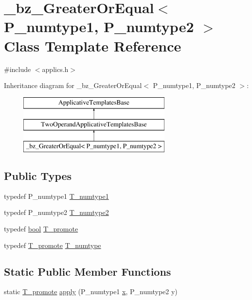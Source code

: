 \hypertarget{class__bz__GreaterOrEqual}{}\section{\+\_\+bz\+\_\+\+Greater\+Or\+Equal$<$ P\+\_\+numtype1, P\+\_\+numtype2 $>$ Class Template Reference}
\label{class__bz__GreaterOrEqual}


{\ttfamily \#include $<$applics.\+h$>$}

Inheritance diagram for \+\_\+bz\+\_\+\+Greater\+Or\+Equal$<$ P\+\_\+numtype1, P\+\_\+numtype2 $>$\+:\begin{figure}[H]
\begin{center}
\leavevmode
\includegraphics[height=3.000000cm]{class__bz__GreaterOrEqual}
\end{center}
\end{figure}
\subsection*{Public Types}
\begin{DoxyCompactItemize}
\item 
typedef P\+\_\+numtype1 \hyperlink{class__bz__GreaterOrEqual_a427aca022106d9b3990725620e1be311}{T\+\_\+numtype1}
\item 
typedef P\+\_\+numtype2 \hyperlink{class__bz__GreaterOrEqual_a1fbd58ed0a844c86926aff76b978a569}{T\+\_\+numtype2}
\item 
typedef \hyperlink{compiler_8h_abb452686968e48b67397da5f97445f5b}{bool} \hyperlink{class__bz__GreaterOrEqual_ac9f645d85a53224a8e3d290669b2bf26}{T\+\_\+promote}
\item 
typedef \hyperlink{class__bz__GreaterOrEqual_ac9f645d85a53224a8e3d290669b2bf26}{T\+\_\+promote} \hyperlink{class__bz__GreaterOrEqual_a1a37e3009e97239db0563d2ae2696a96}{T\+\_\+numtype}
\end{DoxyCompactItemize}
\subsection*{Static Public Member Functions}
\begin{DoxyCompactItemize}
\item 
static \hyperlink{class__bz__GreaterOrEqual_ac9f645d85a53224a8e3d290669b2bf26}{T\+\_\+promote} \hyperlink{class__bz__GreaterOrEqual_a262b8d5bd6a0a093fd66ac56f137804f}{apply} (P\+\_\+numtype1 \hyperlink{vecnorm1_8cc_ac73eed9e41ec09d58f112f06c2d6cb63}{x}, P\+\_\+numtype2 y)
\end{DoxyCompactItemize}



